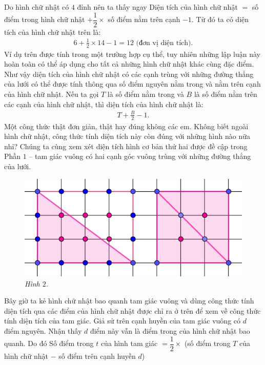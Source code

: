 \begin{multicols}{2}
	\vskip 0.1cm
	Do hình chữ nhật có $4$ đỉnh nên ta thấy ngay
	\vskip 0.1cm
	Diện tích của hình chữ nhật $=$ số điểm trong hình chữ nhật 
	$+ \dfrac{1}{2} \times$ số điểm nằm trên cạnh
	$- 1$.
	\vskip 0.1cm
	Từ đó ta có diện tích của hình chữ nhật trên là:
	\begin{align*}
		6 + \frac{1}{2}\times14 - 1 = 12 \text{ (đơn vị diện tích).}
	\end{align*}
	Ví dụ trên được tính trong một trường hợp cụ thể, tuy nhiên những lập luận này hoàn toàn có thể áp dụng cho tất cả những hình chữ nhật khác cùng đặc điểm. Như vậy diện tích của hình chữ nhật có các cạnh trùng với những đường thẳng của lưới có thể được tính thông qua số điểm nguyên nằm trong và nằm trên cạnh của hình chữ nhật. Nếu ta gọi $T$ là số điểm nằm trong và $B$ là số điểm nằm trên các cạnh của hình chữ nhật, thì diện tích của hình chữ nhật là:
	\begin{align*}
		T+  \frac{B}{2} - 1.
	\end{align*}
	Một công thức thật đơn giản, thật hay đúng không các em. Không biết ngoài hình chữ nhật, công thức tính diện tích này còn đúng với những hình nào nữa nhỉ?
	\vskip 0.1cm
	Chúng ta cùng xem xét diện tích hình cơ bản thứ hai được đề cập trong Phần $1$ -- tam giác vuông có hai cạnh góc vuông trùng với những đường thẳng của lưới.
	\begin{figure}[H]
		\vspace*{-5pt}
		\centering
		\captionsetup{labelformat= empty, justification=centering}
		\includegraphics[width= 0.7\linewidth]{2}
		\caption{\small\textit{\color{toancuabi}Hình $2$.}}
		\vspace*{-10pt}
	\end{figure}
	Bây giờ ta kẻ hình chữ nhật bao quanh tam giác vuông và dùng công thức tính diện tích qua các điểm của hình chữ nhật được chỉ ra ở trên để xem về công thức tính diện tích của tam giác.
	\vskip 0.1cm
	Giả sử trên cạnh huyền của tam giác vuông có $d$ điểm nguyên. Nhận thấy $d$ điểm này vẫn là điểm trong của hình chữ nhật bao quanh. Do đó
	\vskip 0.1cm
	Số điểm trong $t$ của hình tam giác $= \dfrac{1}{2} \times $ (số điểm trong $T$ của hình chữ nhật $-$ số điểm trên cạnh huyền $d$)

\end{multicols}
